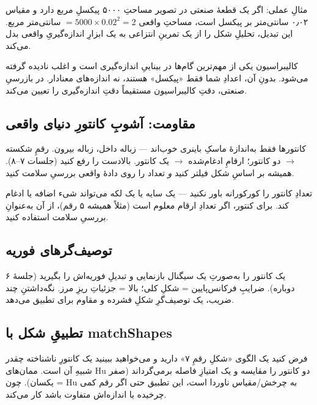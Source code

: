 \documentclass[12pt,a4paper]{article}
\begin{document}
مثالِ عملی: اگر یک قطعهٔ صنعتی در تصویر مساحتِ ۵۰۰۰ پیکسلِ مربع دارد و مقیاس ۰٫۰۲ سانتی‌متر بر
پیکسل است، مساحتِ واقعی $= 5000 \times 0.02^2 = 2$ سانتی‌متر مربع. این تبدیل، تحلیلِ شکل را از یک
تمرینِ انتزاعی به یک ابزارِ اندازه‌گیریِ واقعی بدل می‌کند.

\begin{nokte}
کالیبراسیون یکی از مهم‌ترین گام‌ها در بیناییِ اندازه‌گیری است و اغلب نادیده گرفته می‌شود. بدونِ آن،
اعدادِ شما فقط «پیکسل» هستند، نه اندازه‌های معنادار. در بازرسیِ صنعتی، دقتِ کالیبراسیون مستقیماً
دقتِ اندازه‌گیری را تعیین می‌کند.
\end{nokte}

\subsection{مقاومت: آشوبِ کانتورِ دنیای واقعی}

کانتورها فقط به‌اندازهٔ ماسکِ باینری خوب‌اند — زباله داخل، زباله بیرون. رقمِ شکسته $\rightarrow$
دو کانتور؛ ارقامِ ادغام‌شده $\rightarrow$ یک کانتور. بالادست را رفع کنید (جلسات ۷–۸). همیشه بر
اساسِ شکل فیلتر کنید \emph{و} تعداد را روی دادهٔ واقعی بررسیِ سلامت کنید.

\begin{hoshdar}
تعدادِ کانتور را کورکورانه باور نکنید — یک سایه یا یک لکه می‌تواند شیء اضافه یا ادغام کند. برای
کنتور، اگر تعدادِ ارقام معلوم است (مثلاً همیشه ۵ رقم)، از آن به‌عنوانِ بررسیِ سلامت استفاده کنید.
\end{hoshdar}

\subsection{توصیف‌گرهای فوریه}

یک کانتور را به‌صورتِ یک سیگنال بازنمایی و تبدیلِ فوریه‌اش را بگیرید (جلسهٔ ۶ دوباره). ضرایبِ
فرکانس‌پایین = شکلِ کلی؛ بالا = جزئیاتِ ریزِ مرز. نگه‌داشتنِ چند ضریب، یک توصیف‌گرِ شکلِ فشرده و
مقاوم برای تطبیق می‌دهد.

\subsection{تطبیقِ شکل با matchShapes}

فرض کنید یک الگوی «شکلِ رقمِ ۷» دارید و می‌خواهید ببینید یک کانتورِ ناشناخته چقدر شبیهِ آن است.
 ممان‌های Huِ دو کانتور را مقایسه و یک امتیازِ فاصله برمی‌گرداند (صفر = یکسان).
چون Hu به چرخش/مقیاس ناوردا است، این تطبیق حتی اگر رقم کمی چرخیده یا اندازه‌اش متفاوت باشد کار می‌کند.
\end{document}
